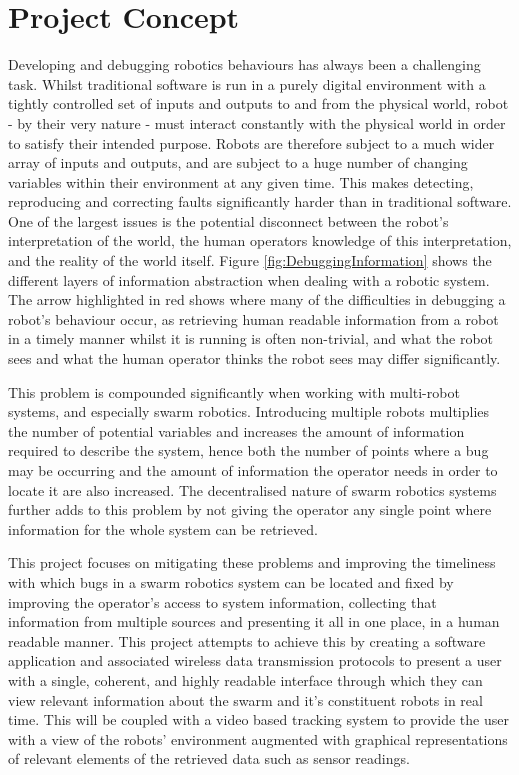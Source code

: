 
\section{Project Concept}
Developing and debugging robotics behaviours has always been a challenging task. Whilst traditional software is run in a purely digital environment with a tightly controlled set of inputs and outputs to and from the physical world, robot - by their very nature - must interact constantly with the physical world in order to satisfy their intended purpose. Robots are therefore subject to a much wider array of inputs and outputs, and are subject to a huge number of changing variables within their environment at any given time. This makes detecting, reproducing and correcting faults significantly harder than in traditional software. One of the largest issues is the potential disconnect between the robot's interpretation of the world, the human operators knowledge of this interpretation, and the reality of the world itself. Figure \ref{fig:DebuggingInformation} shows the different layers of information abstraction when dealing with a robotic system. The arrow highlighted in red shows where many of the difficulties in debugging a robot's behaviour occur, as retrieving human readable information from a robot in a timely manner whilst it is running is often non-trivial, and what the robot sees and what the human operator thinks the robot sees may differ significantly.

This problem is compounded significantly when working with multi-robot systems, and especially swarm robotics. Introducing multiple robots multiplies the number of potential variables and increases the amount of information required to describe the system, hence both the number of points where a bug may be occurring and the amount of information the operator needs in order to locate it are also increased. The decentralised nature of swarm robotics systems further adds to this problem by not giving the operator any single point where information for the whole system can be retrieved.

This project focuses on mitigating these problems and improving the timeliness with which bugs in a swarm robotics system can be located and fixed by improving the operator's access to system information, collecting that information from multiple sources and presenting it all in one place, in a human readable manner. This project attempts to achieve this by creating a software application and associated wireless data transmission protocols to present a user with a single, coherent, and highly readable interface through which they can view relevant information about the swarm and it's constituent robots in real time. This will be coupled with a video based tracking system to provide the user with a view of the robots' environment augmented with graphical representations of relevant elements of the retrieved data such as sensor readings.

